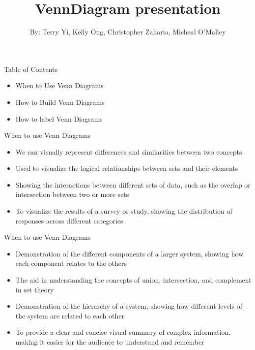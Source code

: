 \documentclass{beamer}
\title{VennDiagram presentation}
\author{By: Terry Yi, Kelly Ong, Christopher Zaharia, Micheal O'Malley}
\begin{document}
	
	\frame{\titlepage}
	\begin{frame}[t,label=frameA] {Table of Contents}
		\begin{itemize}
			\item{When to Use Venn Diagrams}
			\item{How to Build Venn Diagrams}
			\item{How to label Venn Diagrams}
		\end{itemize}
	\end{frame}
	\begin{frame}[t,label=frameA]{When to use Venn Diagrams}
		\begin{itemize}
			\item {We can visually represent differences and similarities between two concepts}
			\item {Used to visualize the logical relationships between sets and their elements}
			\item {Showing the interactions between different sets of data, such as the overlap or intersection between two or more sets}
			\item {To visualize the results of a survey or study, showing the distribution of responses across different categories}
		\end{itemize}
	\end{frame}
	\begin{frame}[t,label=frameA]{When to use Venn Diagrams}
		\begin{itemize}
			\item {Demonstration of the different components of a larger system, showing how each component relates to the others}
			\item {The aid in understanding the concepts of union, intersection, and complement in set theory}
			\item {Demonstration of the hierarchy of a system, showing how different levels of the system are related to each other}
			\item {To provide a clear and concise visual summary of complex information, making it easier for the audience to understand and remember}
		\end{itemize}
	\end{frame}
	
\end{document}
